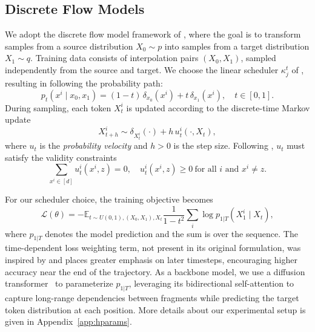 \documentclass{article} %
\begin{document}
\subsection{Discrete Flow Models}
We adopt the discrete flow model framework of \cite{gat2024discrete_flow_matching}, where the goal is to transform samples from a source distribution $X_0 \sim p$ into samples from a target distribution $X_1 \sim q$. Training data consists of interpolation pairs $(X_0, X_1)$, sampled independently from the source and target. We choose the linear scheduler $\kappa_j^t$ of \cite{gat2024discrete_flow_matching}, resulting in following the probability path:
\begin{equation}
p_t(x^i \mid x_0, x_1) = (1-t)\,\delta_{x_0}(x^i) + t\,\delta_{x_1}(x^i), \quad t \in [0,1].
\end{equation}
During sampling, each token $X_t^i$ is updated according to the discrete-time Markov update
\begin{equation}
    X^i_{t+h} \sim \delta_{X_t^i}(\cdot) + h\,u_t^i(\cdot, X_t), \label{eq:dfm_update}
\end{equation}
where $u_t$ is the \emph{probability velocity} and $h>0$ is the step size. Following \cite{gat2024discrete_flow_matching}, $u_t$ must satisfy the validity constraints
\begin{equation}
\sum_{x^i \in [d]} u_t^i(x^i, z) = 0,
\quad u_t^i(x^i, z) \ge 0 \ \text{for all $i$ and $x^i \ne z$}.
\end{equation}



For our scheduler choice, the training objective becomes
\begin{equation}
    \mathcal{L}(\theta) = -\mathbb{E}_{t \sim U(0,1),(X_0,X_1),X_t} \frac{1}{1-t^2} \sum_i \log p_{1|T}(X_1^i \mid X_t),\label{eq:loss}
\end{equation}
where $p_{1|T}$ denotes the model prediction and the sum is over the sequence. The time-dependent loss weighting term, not present in its original formulation, was inspired by \cite{sahoo2024simpleeffectivemaskeddiffusion} and places greater emphasis on later timesteps, encouraging higher accuracy near the end of the trajectory. As a backbone model, we use a diffusion transformer~\citep{Peebles2022DiT} to parameterize $p_{1|T}$, leveraging its bidirectional self-attention to capture long-range dependencies between fragments while predicting the target token distribution at each position. More details about our experimental setup is given in Appendix~\ref{app:hparams}.
\end{document}
